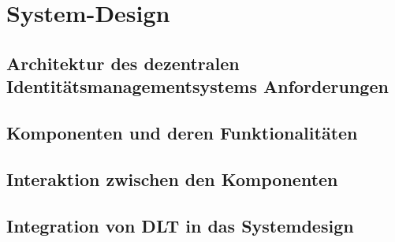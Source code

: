 \chapter{System-Design}
\label{cha:systemdesign}

\section{Architektur des dezentralen Identitätsmanagementsystems Anforderungen}
\blindtext

\section{Komponenten und deren Funktionalitäten}
\blindtext

\section{Interaktion zwischen den Komponenten}
\blindtext

\section{Integration von DLT in das Systemdesign}
\blindtext
